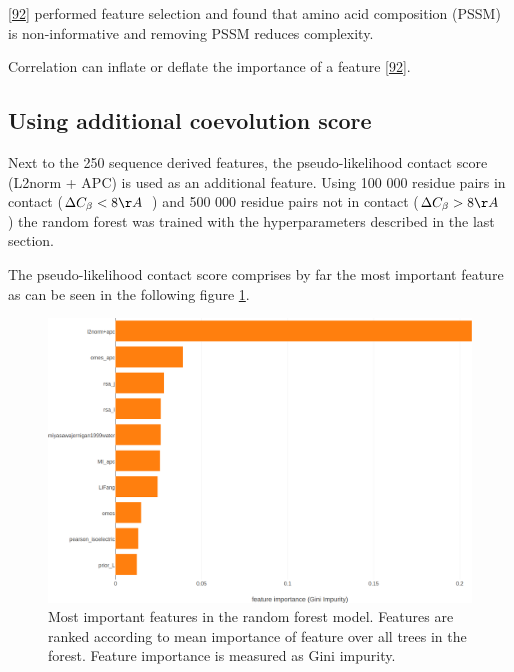 \documentclass[12pt,a4paper,twoside]{book}
\newcommand{\Cb}{C_\beta}
\theoremstyle{definition}
\theoremstyle{definition}
\theoremstyle{remark}
\begin{document}
{[}\protect\hyperlink{ref-Stahl2017}{92}{]} performed feature selection
and found that amino acid composition (PSSM) is non-informative and
removing PSSM reduces complexity.

Correlation can inflate or deflate the importance of a feature
{[}\protect\hyperlink{ref-Stahl2017}{92}{]}.

\subsection{Using additional coevolution score}\label{rf-with-pll-score}

Next to the 250 sequence derived features, the pseudo-likelihood contact
score (L2norm + APC) is used as an additional feature. Using 100 000
residue pairs in contact (\(\Delta \Cb < 8 \AA \; \;\)) and 500 000
residue pairs not in contact (\(\Delta \Cb > 8 \AA \; \;\)) the random
forest was trained with the hyperparameters described in the last
section.

The pseudo-likelihood contact score comprises by far the most important
feature as can be seen in the following figure
\ref{fig:feature-importance-rf-with-pll-score}.






\begin{figure}
\includegraphics[width=0.9\linewidth]{img/random_forest_contact_prior/feature_random_forest_nestimators1000_classweightNone_criterionentropy_maxdepth100_minsamplesleaf100_251features_100kcontacts_500knoncontacts} \caption{Most important
features in the random forest model. Features are ranked according to
mean importance of feature over all trees in the forest. Feature
importance is measured as Gini impurity.}\label{fig:feature-importance-rf-with-pll-score}
\end{figure}
\end{document}
